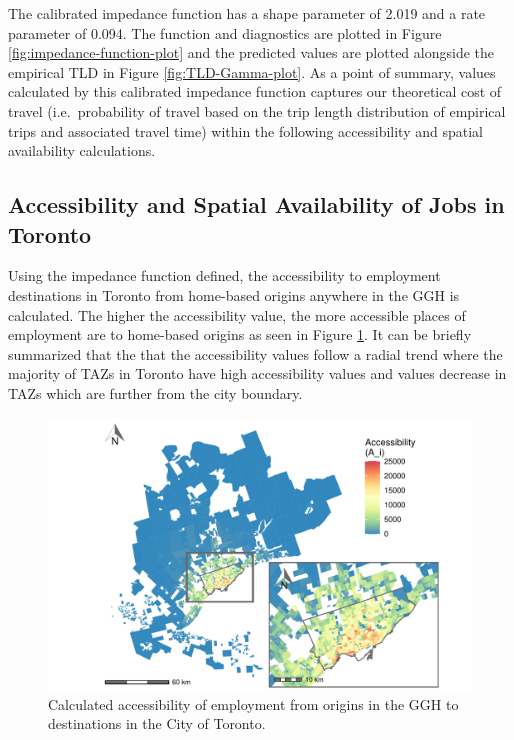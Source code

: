 \documentclass[]{elsarticle} %
\begin{document}
The calibrated impedance function has a shape parameter of 2.019 and a
rate parameter of 0.094. The function and diagnostics are plotted in
Figure \ref{fig:impedance-function-plot} and the predicted values are
plotted alongside the empirical TLD in Figure \ref{fig:TLD-Gamma-plot}.
As a point of summary, values calculated by this calibrated impedance
function captures our theoretical cost of travel (i.e.~probability of
travel based on the trip length distribution of empirical trips and
associated travel time) within the following accessibility and spatial
availability calculations.

\hypertarget{accessibility-and-spatial-availability-of-jobs-in-toronto}{%
\subsection{Accessibility and Spatial Availability of Jobs in
Toronto}\label{accessibility-and-spatial-availability-of-jobs-in-toronto}}

Using the impedance function defined, the accessibility to employment
destinations in Toronto from home-based origins anywhere in the GGH is
calculated. The higher the accessibility value, the more accessible
places of employment are to home-based origins as seen in Figure
\ref{fig:plot-accessibility-Toronto-TTS}. It can be briefly summarized
that the that the accessibility values follow a radial trend where the
majority of TAZs in Toronto have high accessibility values and values
decrease in TAZs which are further from the city boundary.

\begin{figure}
\includegraphics[width=1\linewidth]{Spatial-Availability_files/figure-latex/plot-accessibility-Toronto-TTS-1} \caption{\label{fig:plot-accessibility-Toronto-TTS}Calculated accessibility of employment from origins in the GGH to destinations in the City of Toronto.}\label{fig:plot-accessibility-Toronto-TTS}
\end{figure}
\end{document}
